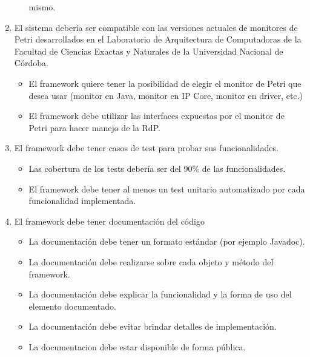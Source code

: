 \begin{enumerate}
\begin{itemize}
            mismo.
        \end{itemize}
    \item El sistema debería ser compatible con las versiones actuales de
    monitores de Petri desarrollados en el Laboratorio de Arquitectura de Computadoras de la
    Facultad de Ciencias Exactas y Naturales de la Universidad Nacional de Córdoba.
        \begin{itemize}
            \item El framework quiere tener la posibilidad de elegir el monitor de
            Petri que desea usar (monitor en Java, monitor en IP Core, monitor en
            driver, etc.)
            \item El framework debe utilizar las interfaces expuestas por el monitor
            de Petri para hacer manejo de la RdP.
        \end{itemize}
    \item El framework debe tener casos de test para probar sus funcionalidades.
        \begin{itemize}
            \item Las cobertura de los tests debería ser del 90\% de las
            funcionalidades.
            \item El framework debe tener al menos un test unitario automatizado
            por cada funcionalidad implementada.
        \end{itemize}
     \item El framework debe tener documentación del código
        \begin{itemize}
          \item La documentación debe tener un formato estándar (por ejemplo
          Javadoc).
          \item La documentación debe realizarse sobre cada objeto y método del
          framework.
          \item La documentación debe explicar la funcionalidad y la forma de
          uso del elemento documentado. 
          \item La documentación debe evitar brindar detalles de implementación.
          \item La documentacion debe estar disponible de forma pública.
        \end{itemize}
\end{enumerate}